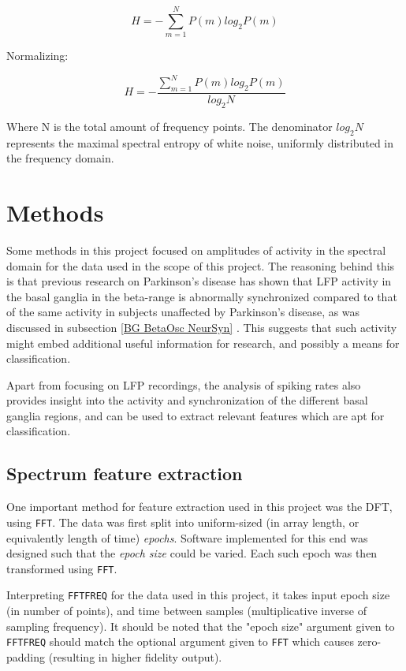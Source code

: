 \documentclass{article}
\begin{document}
\begin{equation}
H = -\sum_{m=1}^N P(m) log_2 P(m)
\end{equation}

Normalizing:

\begin{equation}
H = -\frac{\sum_{m=1}^N P(m) log_2 P(m)}{log_2 N}
\end{equation}

Where N is the total amount of frequency points.
The denominator \begin{math}log_2 N\end{math} represents the maximal spectral entropy of white noise, uniformly distributed in the frequency domain.

\newpage
\section{Methods}

Some methods in this project focused on amplitudes of activity in the spectral domain for the data used in the scope of this project.
The reasoning behind this is that previous research on Parkinson's disease has shown that LFP activity in the basal ganglia in the beta-range is abnormally synchronized compared to that of the same activity in subjects unaffected by Parkinson's disease, as was discussed in subsection \ref{BG BetaOsc NeurSyn} \citep{Cagnan}.
This suggests that such activity might embed additional useful information for research, and possibly a means for classification. 

Apart from focusing on LFP recordings, the analysis of spiking rates also provides insight into the activity and synchronization of the different basal ganglia regions, and can be used to extract relevant features which are apt for classification.

\subsection{Spectrum feature extraction}\label{DFT Method}

One important method for feature extraction used in this project was the DFT, using \texttt{FFT}. 
The data was first split into uniform-sized (in array length, or equivalently length of time) \textit{epochs}.
Software implemented for this end was designed such that the \textit{epoch size} could be varied.
Each such epoch was then transformed using \texttt{FFT}.

Interpreting \texttt{FFTFREQ} for the data used in this project, it takes input epoch size (in number of points), and time between samples (multiplicative inverse of sampling frequency). 
It should be noted that the "epoch size" argument given to \texttt{FFTFREQ} should match the optional argument given to \texttt{FFT} which causes zero-padding (resulting in higher fidelity output).
\end{document}
